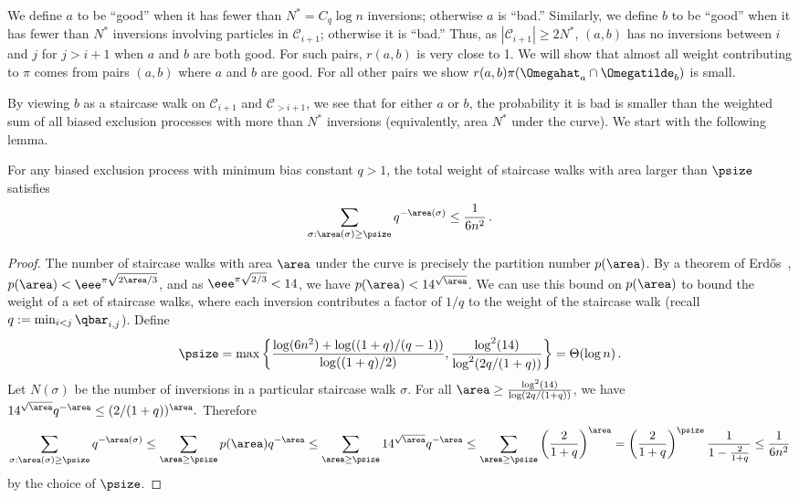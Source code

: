 We define $a$ to be ``good'' when it has fewer than $N^*=C_q\log n$ 
inversions; otherwise $a$ is ``bad.''  Similarly, we define $b$ to be 
``good'' when it has fewer than $N^*$ inversions involving particles in 
$\mathcal{C}_{i+1}$; otherwise it is ``bad.''  Thus, as 
$|\mathcal{C}_{i+1}| \geq 2N^*$, $(a,b)$ has no inversions between $i$ 
and $j$ for $j>i+1$ when $a$ and $b$ are both good.  For such pairs, 
$r(a,b)$ is very close to 1.  We will show that almost all weight 
contributing to $\pi$ comes from pairs $(a,b)$ where $a$ and $b$ 
are good.  For all other pairs we show 
$r(a,b)\pi(\Omegahat_a\cap\Omegatilde_{b})$ is small.  

By viewing $b$ 
as a staircase walk on $\mathcal{C}_{i+1}$ and $\mathcal{C}_{> i+1}$, 
we see that for either $a$ or $b$, the 
probability it is bad is smaller than the weighted sum of all biased 
exclusion processes with more than $N^*$ inversions (equivalently, area 
$N^*$ under the curve).  We start with the following lemma.

\begin{lemma}\label{lem:partitions}
For any biased exclusion process with minimum bias constant $q > 1$, 
the total weight of staircase walks with area larger than $\psize$ satisfies 
\[\sum_{\sigma:\area(\sigma)\geq \psize}q^{-\area(\sigma)} \leq \frac{1}{6n^2}\,.\]
\end{lemma}

\begin{proof}


The number of staircase walks with area $\area$ under the curve is 
precisely the partition number $p(\area)$.  By a theorem of 
Erd\H{o}s~\cite{Erdos42}, $p(\area) < \eee^{\pi\sqrt{2\area/3}}$,
and as $\eee^{\pi\sqrt{2/3}}<14$, we have $p(\area) < 14^{\sqrt{\area}}$.
We can use this bound on $p(\area)$ to bound 
the weight of a set of staircase walks, where each inversion 
contributes a factor of $1/q$ to the weight of the staircase walk 
(recall $q:=\min_{i<j} \qbar_{i,j}$).  
Define 
\[\psize = \max\left\{\frac{\log (6n^2)+\log((1+q)/(q-1))}{\log((1+q)/2)}, \frac{\log^2(14)}{\log^2(2q/(1+q))}\right\} = \Theta(\log n)\,.\]
  Let $N(\sigma)$ be the number of inversions in a particular staircase walk $\sigma$.  
  For all $\area\geq
  \frac{\log^2(14)}{\log(2q/(1+q))}$, we have $14^{\sqrt{\area}}q^{-\area}\leq (2/(1+q))^\area.$
  Therefore 
\[  \sum_{\sigma:\area(\sigma)\geq \psize}q^{-\area(\sigma)}\leq \sum_{\area\geq
    \psize}p(\area)q^{-\area} \leq \sum_{\area\geq \psize}14^{\sqrt{\area}}q^{-\area}
%
  \leq \sum_{\area\geq \psize}\left(\frac{2}{1+q}\right)^{\area}  %
     =\left(\frac{2}{1+q}\right)^{\psize}\frac{1}{1-\frac{2}{1+q}}
       \leq \frac{1}{6n^2}\]
by the choice of $\psize$.        
\end{proof}

